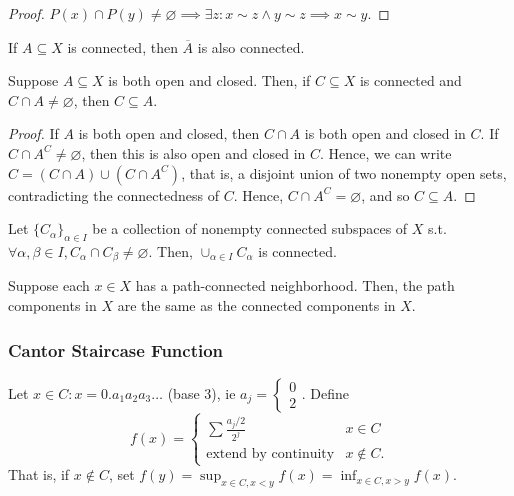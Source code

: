 \begin{proof}
    $P(x) \cap P(y) \neq \varnothing \implies \exists z : x \sim z \wedge y \sim z \implies x \sim y$.
\end{proof}

\begin{lemma}
    If $A \subseteq X$ is connected, then $\overline{A}$ is also connected.
\end{lemma}

\begin{lemma}
    Suppose $A \subseteq X$ is both open and closed. Then, if $C\subseteq X$ is connected and $C \cap A \neq \varnothing$, then $C \subseteq A$.
\end{lemma}
\begin{proof}
    If $A$ is both open and closed, then $C \cap A$ is both open and closed in $C$. If $C \cap A^C \neq \varnothing$, then this is also open and closed in $C$. Hence, we can write $C = (C \cap A) \cup (C \cap A^C)$, that is, a disjoint union of two nonempty open sets, contradicting the connectedness of $C$. Hence, $C \cap A^C = \varnothing$, and so $C \subseteq A$.
\end{proof}

\begin{proposition}
    Let $\{C_\alpha\}_{\alpha \in I}$ be a collection of nonempty connected subspaces of $X$ s.t. $\forall \alpha, \beta \in I, C_\alpha \cap C_\beta \neq \varnothing$. Then, $\cup_{\alpha \in I} C_\alpha$ is connected.
\end{proposition}

\begin{proposition}
    Suppose each $x \in X$ has a path-connected neighborhood. Then, the path components in $X$ are the same as the connected components in $X$.
\end{proposition}

\subsubsection{Cantor Staircase Function}
\begin{definition}
    Let $x \in C : x = 0. a_1 a_2 a_3 \dots$ (base 3), ie $a_j = \begin{cases}
        0\\
        2
    \end{cases}$. Define \[
    f(x) = \begin{cases}
        \sum \frac{a_j/2}{2^j} & x \in C\\
        \text{extend by continuity} & x \notin C.
    \end{cases}
    \]
    That is, if $x \notin C$, set $f(y)= \sup_{x \in C, x < y} f(x) = \inf_{x \in C, x > y} f(x)$.
\end{definition}

